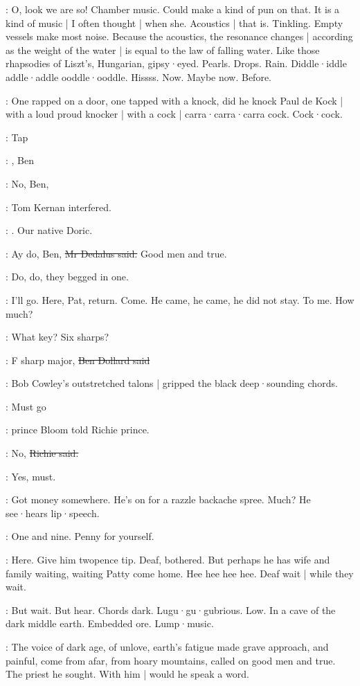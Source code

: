 \BloomInt:
O,
look we are so!
Chamber music.
Could make a kind of pun on that.
It is a kind of music |
I often thought |
when she.
Acoustics |
that is.
Tinkling.
Empty vessels make most noise.
Because the acoustics,
the resonance changes |
according as the weight of the water |
is equal to the law of falling water.
Like those rhapsodies of Liszt's,
Hungarian,
gipsy·eyed.
Pearls.
Drops.
Rain.
Diddle·iddle addle·addle ooddle·ooddle.
Hissss.
Now.
Maybe now.
Before.

\BloomInt:
One rapped on a door,
one tapped with a knock,
did he knock Paul de Kock |
with a loud proud knocker |
with a cock |
carra·carra·carra cock.
Cock·cock.

\stripling:
Tap

\cowley:
,
Ben

:
No, Ben,

:
Tom Kernan interfered.

:
.
Our native Doric.

\simon:
Ay do,
Ben,
\sout{Mr Dedalus said.}
Good men and true.

:
Do,
do,
they begged in one.

\BloomInt:
I'll go.
Here,
Pat,
return.
Come.
He came,
he came,
he did not stay.
To me.
How much?

\cowley:
What key?
Six sharps?

\dollard:
F sharp major,
\sout{Ben Dollard said}

:
Bob Cowley's outstretched talons |
gripped the black deep·sounding chords.

\Bloom:
Must go

:
prince Bloom told Richie prince.

\goulding:
No,
\sout{Richie said.}

\Bloom:
Yes,
must.

\BloomInt:
Got money somewhere.
He's on for a razzle backache spree.
Much?
He see·hears lip·speech.

\Bloom:
One and nine.
Penny for yourself.

\BloomInt:
Here.
Give him twopence tip.
Deaf,
bothered.
But perhaps he has wife and family waiting,
waiting Patty come home.
Hee hee hee hee.
Deaf wait |
while they wait.

\BloomInt:
But wait.
But hear.
Chords dark.
Lugu·gu·gubrious.
Low.
In a cave of the dark middle earth.
Embedded ore.
Lump·music.

:
The voice of dark age,
of unlove,
earth's fatigue made grave approach,
and painful,
come from afar,
from hoary mountains,
called on good men and true.
The priest he sought.
With him |
would he speak a word.

